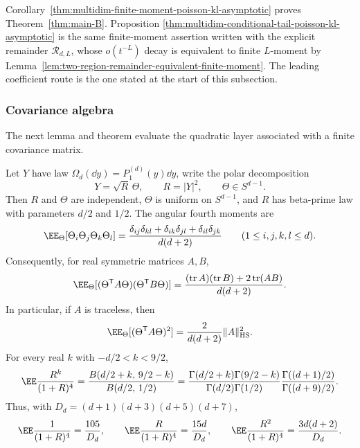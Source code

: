 \begin{remark}
Corollary~\ref{thm:multidim-finite-moment-poisson-kl-asymptotic} proves
Theorem~\ref{thm:main-B}.  Proposition
\ref{thm:multidim-conditional-tail-poisson-kl-asymptotic} is the same
finite-moment assertion written with the explicit remainder
\(\mathcal R_{d,L}\), whose \(o(t^{-L})\) decay is equivalent to finite
\(L\)-moment by
Lemma~\ref{lem:two-region-remainder-equivalent-finite-moment}.  The leading
coefficient route is the one stated at the start of this subsection.
\end{remark}

\subsubsection*{Covariance algebra}\leavevmode\par\smallskip

The next lemma and theorem evaluate the quadratic layer associated with a
finite covariance matrix.

\begin{lemma}%
\label{lem:radial-angular-contractions}
Let \(Y\) have law
\(\Omega_d(\dd y)=P_1^{(d)}(y)\dd y\), write the polar decomposition
\[
Y=\sqrt R\,\Theta,\qquad R=|Y|^2,\qquad \Theta\in S^{d-1}.
\]
Then \(R\) and \(\Theta\) are independent, \(\Theta\) is uniform on
\(S^{d-1}\), and \(R\) has beta-prime law with parameters \(d/2\) and
\(1/2\).  The angular fourth moments are
\begin{equation}\label{eq:spherical-fourth-contraction}
\EE_\Theta[\Theta_i\Theta_j\Theta_k\Theta_l]
=
\frac{\delta_{ij}\delta_{kl}
+\delta_{ik}\delta_{jl}
+\delta_{il}\delta_{jk}}{d(d+2)}
\qquad(1\le i,j,k,l\le d).
\end{equation}
Consequently, for real symmetric matrices \(A,B\),
\begin{equation}\label{eq:spherical-quadratic-contraction}
\EE_\Theta[
(\Theta^{\mathsf T}A\Theta)(\Theta^{\mathsf T}B\Theta)]
=
\frac{(\operatorname{tr}A)(\operatorname{tr}B)
+2\operatorname{tr}(AB)}{d(d+2)}.
\end{equation}
In particular, if \(A\) is traceless, then
\begin{equation}\label{eq:spherical-traceless-square}
\EE_\Theta[(\Theta^{\mathsf T}A\Theta)^2]
=\frac{2}{d(d+2)}\|A\|_{\rm HS}^2 .
\end{equation}
For every real \(k\) with \(-d/2<k<9/2\),
\begin{equation}\label{eq:radial-beta-prime-contraction-general}
\EE\frac{R^k}{(1+R)^4}
=
\frac{B(d/2+k,\,9/2-k)}{B(d/2,\,1/2)}
=
\frac{\Gamma(d/2+k)\Gamma(9/2-k)}
{\Gamma(d/2)\Gamma(1/2)}
\frac{\Gamma((d+1)/2)}{\Gamma((d+9)/2)} .
\end{equation}
Thus, with \(D_d=(d+1)(d+3)(d+5)(d+7)\),
\begin{equation}\label{eq:radial-beta-prime-contractions-low}
\EE\frac{1}{(1+R)^4}=\frac{105}{D_d},\qquad
\EE\frac{R}{(1+R)^4}=\frac{15d}{D_d},\qquad
\EE\frac{R^2}{(1+R)^4}=\frac{3d(d+2)}{D_d}.
\end{equation}
\end{lemma}

